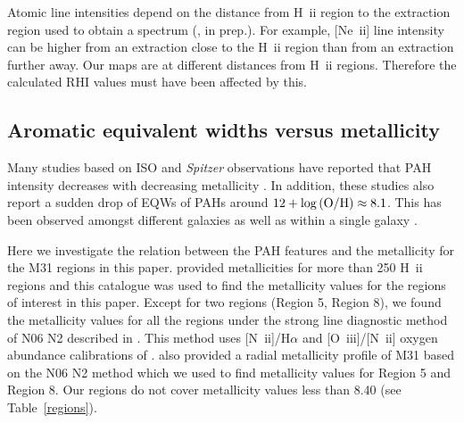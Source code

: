 %

Atomic line intensities depend on the distance from H~{\sc ii} region to the extraction region used to obtain a spectrum (\citealt{Dave2014}, in prep.). 
For example, [Ne~{\sc ii}]  line intensity can be higher from an extraction close to the H~{\sc ii} region than from an extraction further away. 
Our maps are at different distances from H~{\sc ii} regions. Therefore the calculated RHI values must have been affected by this.

\subsection{Aromatic equivalent widths versus metallicity}
\label{sect:eqw_met}
Many studies based on ISO and {\em Spitzer} observations have reported that PAH intensity decreases with decreasing metallicity \citep{Calzetti:2010fk}. 
In addition, these studies also report a sudden drop of EQWs of PAHs around $12+\log{\rm (O/H)} \approx 8.1$. 
This has been observed amongst different galaxies \citep{Engelbracht_2008} as well as within a single galaxy \citep{Gordon:2008lr}. 

Here we investigate the relation between the PAH features and the metallicity for the M31 regions in this paper. 
\citet{Sanders_2011} provided metallicities for more than 250 H~{\sc ii} regions and this catalogue was used to find the metallicity values for 
the regions of interest in this paper. Except for two regions (Region 5, Region 8), we found the metallicity values for all the regions under the 
strong line diagnostic method of N06 N2 described in \citet{Sanders_2011}. This method uses  [N~{\sc ii}]/H$\alpha$ and  [O~{\sc iii}]/[N~{\sc ii}] 
oxygen abundance calibrations of \citealt{Nagao2006}. \citet{Sanders_2011} also provided a radial metallicity profile of M31 based on the N06 
N2 method which we used to find metallicity values for Region 5 and Region 8. Our regions do not cover metallicity values less than 8.40 (see Table~\ref{regions}).


